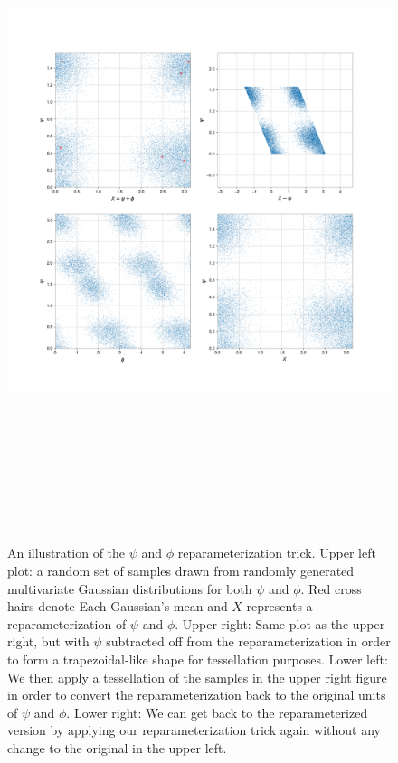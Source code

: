 \begin{figure}
    \centering
    \includegraphics[width=16cm,height=20cm,keepaspectratio]{figures/Xpsi.png}
    \caption[An illustration of the $\psi$ and $\phi$ reparameterization trick.]{An illustration of the $\psi$ and $\phi$ reparameterization trick. Upper left 
    plot: a random set of samples drawn from randomly generated multivariate Gaussian distributions for both $\psi$ and $\phi$. Red cross hairs denote Each Gaussian's mean and $X$ represents a reparameterization of $\psi$ and $\phi$. Upper right: Same plot as the upper right, but with $\psi$ subtracted off from the reparameterization in 
    order to form a trapezoidal-like shape for tessellation purposes. Lower left: We then apply a tessellation of the samples in the upper right figure in order to convert the reparameterization back to the original units of $\psi$ and $\phi$. Lower right: We can get back to the reparameterized version by applying our reparameterization trick again without any change to the original in the upper left.}
    \label{fig:Xpsi}
\end{figure}

